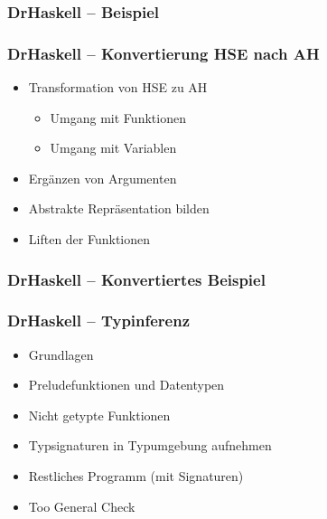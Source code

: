 \begin{frame}[fragile]
\frametitle{DrHaskell -- Beispiel}

\end{frame}

\begin{frame}
	\frametitle{DrHaskell -- Konvertierung HSE nach AH}
	\begin{itemize}
		\item Transformation von HSE zu AH
		  \begin{itemize}
		    \item Umgang mit Funktionen
		    \item Umgang mit Variablen
		  \end{itemize}
		\item Ergänzen von Argumenten
		\item Abstrakte Repräsentation bilden
		\item Liften der Funktionen
	\end{itemize}
\end{frame}

\begin{frame}[fragile]
\frametitle{DrHaskell -- Konvertiertes Beispiel}

\end{frame}

\begin{frame}
  \frametitle{DrHaskell -- Typinferenz}
  \begin{itemize}
    \item Grundlagen
    \item Preludefunktionen und Datentypen
    \item Nicht getypte Funktionen
    \item Typsignaturen in Typumgebung aufnehmen
    \item Restliches Programm (mit Signaturen)
    \item \glqq{}Too General Check\grqq{}
  \end{itemize}
\end{frame}
